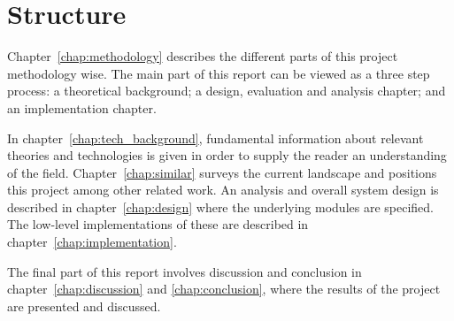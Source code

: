 \section{Structure}
  \label{sec:structure}

Chapter~\ref{chap:methodology} describes the different parts of this project methodology wise. The main part of this report can be viewed as a three step process: a theoretical background; a design, evaluation and analysis chapter; and an implementation chapter.

In chapter~\ref{chap:tech_background}, fundamental information about relevant theories and technologies is given in order to supply the reader an understanding of the field. Chapter~\ref{chap:similar} surveys the current landscape and positions this project among other related work. An analysis and overall system design is described in chapter~\ref{chap:design} where the underlying modules are specified. The low-level implementations of these are described in chapter~\ref{chap:implementation}.

The final part of this report involves discussion and conclusion in chapter~\ref{chap:discussion} and \ref{chap:conclusion}, where the results of the project are presented and discussed.
